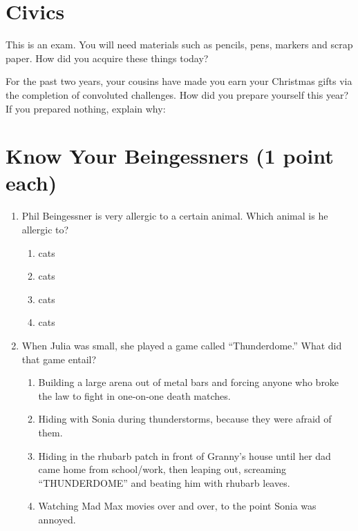 \documentclass[11pt]{exam}
\begin{document}
\begin{questions}




\newpage
\section{Civics}
\addpoints

\question[2] This is an exam. You will need materials such as pencils, pens,
markers and scrap paper. How did you acquire these things today?
\vfill

\question[3] For the past two years, your cousins have made you earn your
Christmas gifts via the completion of convoluted challenges. How did you prepare
yourself this year? If you prepared nothing, explain why:
\vfill





\newpage
\section{Know Your Beingessners (1 point each)}

\begin{enumerate}
\item Phil Beingessner is very allergic to a certain animal. Which animal is he allergic to?

\begin{enumerate}
\item cats
\item cats
\item cats
\item cats
\end{enumerate}



\item When Julia was small, she played a game called ``Thunderdome.'' What did that game entail?

\begin{enumerate}
\item Building a large arena out of metal bars and forcing anyone who broke the law to fight in one-on-one death matches.
\item Hiding with Sonia during thunderstorms, because they were afraid of them.
\item Hiding in the rhubarb patch in front of Granny’s house until her dad came home from
school/work, then leaping out, screaming ``THUNDERDOME'' and beating him with
rhubarb leaves.
\item Watching Mad Max movies over and over, to the point Sonia was annoyed.
\end{enumerate}




\end{enumerate}
\end{questions}
\end{document}
